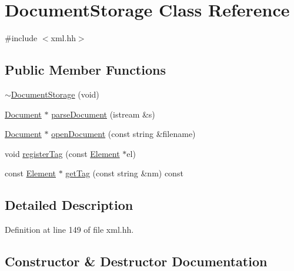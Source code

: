 \hypertarget{class_document_storage}{}\section{Document\+Storage Class Reference}
\label{class_document_storage}


{\ttfamily \#include $<$xml.\+hh$>$}

\subsection*{Public Member Functions}
\begin{DoxyCompactItemize}
\item 
\mbox{\hyperlink{class_document_storage_a873c6e80bdd551f411a77b4d61a06b22}{$\sim$\+Document\+Storage}} (void)
\item 
\mbox{\hyperlink{class_document}{Document}} $\ast$ \mbox{\hyperlink{class_document_storage_a25cfe61f8b2cb67d621c46ae0104f84e}{parse\+Document}} (istream \&s)
\item 
\mbox{\hyperlink{class_document}{Document}} $\ast$ \mbox{\hyperlink{class_document_storage_aaba17671821692988f7b2b78eb97f27e}{open\+Document}} (const string \&filename)
\item 
void \mbox{\hyperlink{class_document_storage_a0f74401ca5bd1e2f40ccb93ba1cf5349}{register\+Tag}} (const \mbox{\hyperlink{class_element}{Element}} $\ast$el)
\item 
const \mbox{\hyperlink{class_element}{Element}} $\ast$ \mbox{\hyperlink{class_document_storage_a10fdfff18994e73daacdb63b4df7f863}{get\+Tag}} (const string \&nm) const
\end{DoxyCompactItemize}


\subsection{Detailed Description}


Definition at line 149 of file xml.\+hh.



\subsection{Constructor \& Destructor Documentation}
\mbox{\label{class_document_storage_a873c6e80bdd551f411a77b4d61a06b22}} 
